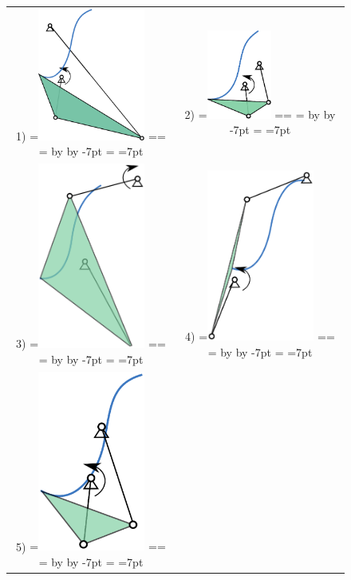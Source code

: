 \documentclass[twocolumn,10pt]{asme2ej}
\makeatletter
\newcommand{\putindeepbox}[2][0.7\baselineskip]{{%
    \setbox0=\hbox{#2}%
    \setbox0=\vbox{\noindent\hsize=\wd0\unhbox0}
    \@tempdima=\dp0
    \advance\@tempdima by \ht0
    \advance\@tempdima by -#1\relax
    \dp0=\@tempdima
    \ht0=#1\relax
    \box0
}}
\makeatother
\begin{document}
\begin{figure}
\begin{tabular}{cc}
  1)\putindeepbox[7pt]{\includegraphics[width=100pt]{figure/path_solutions/path_sol1.eps}}
    & 2)\putindeepbox[7pt]{\includegraphics[width=60pt]{figure/path_solutions/path_sol2.eps}} \\
  3)\putindeepbox[7pt]{\includegraphics[width=100pt]{figure/path_solutions/path_sol3.eps}}
    & 4)\putindeepbox[7pt]{\includegraphics[width=100pt]{figure/path_solutions/path_sol4.eps}}\\
  5)\putindeepbox[7pt]{\includegraphics[width=100pt]{figure/path_solutions/path_sol5.eps}}

\end{tabular}
\end{figure}
\end{document}
